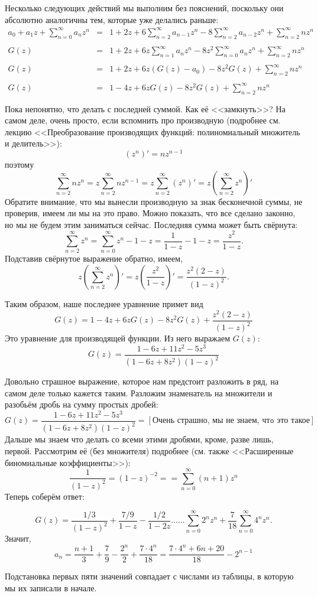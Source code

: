 \documentclass[12pt, letterpaper]{extarticle}
\begin{document}
Несколько следующих действий мы выполним без пояснений, поскольку они абсолютно аналогичны тем, которые уже делались раньше:
\[
  \begin{array}{rcl}
    a_0+a_1z+\sum_{n=0}^{\infty}a_nz^n&=& 1+2z+6\sum_{n=2}^{\infty}a_{n-1}z^n-8\sum_{n=2}^{\infty}a_{n-2}z^n+\sum_{n=2}^{\infty}nz^n \\\\
    G(z) &=& 1+2z+6z\sum_{n=1}^{\infty}a_nz^n-8z^2\sum_{n=0}^{\infty}a_nz^n+\sum_{n=2}^{\infty}nz^n \\\\
    G(z) &=& 1+2z+6z\left(G(z)-a_0\right)-8z^2G(z)+\sum_{n=2}^{\infty}nz^n \\\\
    G(z) &=& 1-4z+6zG(z)-8z^2G(z)+\sum_{n=2}^{\infty}nz^n \\\\
  \end{array}
\]
Пока непонятно, что делать с последней суммой. Как её <<замкнуть>>? На самом деле, очень просто, если вспомнить про производную (подробнее см. лекцию <<Преобразование производящих функций: полиномиальный множитель и делитель>>):
\[(z^n)'=nz^{n-1}\]
поэтому
\[\sum_{n=2}^{\infty}nz^n=z\sum_{n=2}^{\infty}nz^{n-1}=z\sum_{n=2}^{\infty}\left(z^n\right)'=z\left(\sum_{n=2}^{\infty}z^n\right)'\]
Обратите внимание, что мы вынесли производную за знак бесконечной суммы, не проверив, имеем ли мы на это право. Можно показать, что все сделано законно, но мы не будем этим заниматься сейчас. Последняя сумма может быть свёрнута:
\[\sum_{n=2}^{\infty}z^n=\sum_{n=0}^{\infty}z^n-1-z=\frac{1}{1-z}-1-z=\frac{z^2}{1-z}.\]
Подставив свёрнутое выражение обратно, имеем,
\[z\left(\sum_{n=2}^{\infty}z^n\right)' = z \left(\frac{z^2}{1-z}\right)'=\frac{z^2(2-z)}{(1-z)^2}.\]

Таким образом, наше последнее уравнение примет вид
\[G(z) = 1 -4z + 6zG(z)-8z^2G(z) + \frac{z^2(2-z)}{(1-z)^2}\]
Это уравнение для производящей функции. Из него выражаем $G(z)$:
\[G(z) = \frac{1-6z+11z^2-5z^3}{(1-6z+8z^2)(1-z)^2}\]

Довольно страшное выражение, которое нам предстоит разложить в ряд, на самом деле только кажется таким. Разложим знаменатель на множители и разобьём дробь на сумму простых дробей:
\[G(z) = \frac{1-6z+11z^2-5z^3}{(1-6z+8z^2)(1-z)^2}=\left[\texttt{Очень страшно, мы не знаем, чтo это такое}\right]\]
Дальше мы знаем что делать со всеми этими дробями, кроме, разве лишь, первой. Рассмотрим её (без множителя) подробнее (см. также <<Расширенные биномиальные коэффициенты>>):
\[\frac{1}{(1-z)^2}=(1-z)^{-2}==\sum_{n=0}^{\infty}(n+1)z^n\]
Теперь соберём ответ:

\[G(z) = \frac{1/3}{(1-z)^2}+\frac{7/9}{1-z}-\frac{1/2}{1-2z}...
...\sum_{n=0}^{\infty}2^nz^n
+\frac{7}{18}\sum_{n=0}^{\infty}4^nz^n.\]
Значит,
\[
a_n=\frac{n+1}{3}+\frac{7}{9}-\frac{2^n}{2}+\frac{7\cdot4^n}{18}=\frac{7\cdot4^n+6n+20}{18} - 2^{n-1}\]

Подстановка первых пяти значений совпадает с числами из таблицы, в которую мы их записали в начале.
\end{document}

